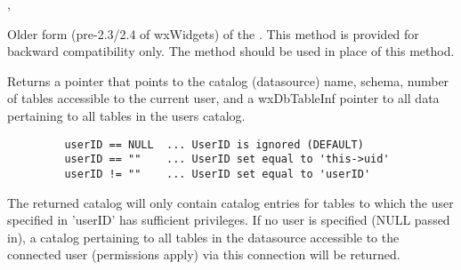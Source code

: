 
, 

\label{wxdbfwdonlycursors}


Older form (pre-2.3/2.4 of wxWidgets) of the
.  This method is
provided for backward compatibility only.  The method
 should be
used in place of this method.



\label{wxdbgetcatalog}


Returns a  pointer that points to the catalog
(datasource) name, schema, number of tables accessible to the current user,
and a wxDbTableInf pointer to all data pertaining to all tables in the users
catalog.



\begin{verbatim}
         userID == NULL  ... UserID is ignored (DEFAULT)
         userID == ""    ... UserID set equal to 'this->uid'
         userID != ""    ... UserID set equal to 'userID'
\end{verbatim}


The returned catalog will only contain catalog entries for tables to which the user specified in 'userID' has sufficient privileges.  If no user is specified (NULL passed in), a catalog pertaining to all tables in the datasource accessible to the connected user (permissions apply) via this connection will be returned.

\label{wxdbgetcolumncount}



